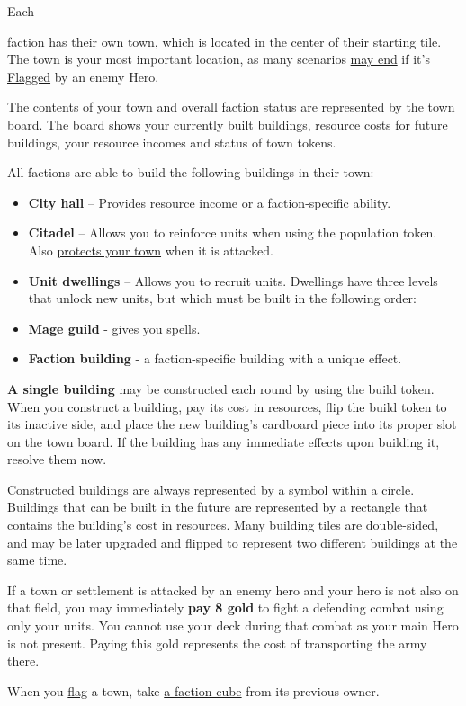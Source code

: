 \hypertarget{Town}{Each} faction has their own town, which is located in the center of their starting tile.
The town is your most important location, as many scenarios \hyperlink{End}{may end} if it's \hyperlink{Categories}{Flagged} by an enemy Hero.\par
The contents of your town and overall faction status are represented by the town board.
The board shows your currently built buildings, resource costs for future buildings, your resource incomes and status of town tokens.\par
All factions are able to build the following buildings in their town:
\begin{itemize}
  \item \textbf{City hall} – Provides resource income or a faction-specific ability.
  \item \textbf{Citadel} – Allows you to reinforce units when using the population token.
Also \hyperlink{Walls}{protects your town} when it is attacked.
  \item \textbf{Unit dwellings} – Allows you to recruit units.
Dwellings have three levels that unlock new units, but which must be built in the following order:
  \item \textbf{Mage guild} - gives you \hyperlink{spells}{spells}.
  \item \textbf{Faction building} - a faction-specific building with a unique effect.
\end{itemize}
\textbf{A single building} may be constructed each round by using the build token.
When you construct a building, pay its cost in resources, flip the build token to its inactive side, and place the new building’s cardboard piece into its proper slot on the town board.
If the building has any immediate effects upon building it, resolve them now.\par
Constructed buildings are always represented by a symbol within a circle.
Buildings that can be built in the future are represented by a rectangle that contains the building's cost in resources.
Many building tiles are double-sided, and may be later upgraded and flipped to represent two different buildings at the same time.\par
If a town or settlement is attacked by an enemy hero and your hero is not also on that field, you may immediately \textbf{pay 8 gold} to fight a defending combat using only your units.
You cannot use your deck during that combat as your main Hero is not present.
Paying this gold represents the cost of transporting the army there.\par
When you \hyperlink{Categories}{flag} a town, take \hyperlink{End}{a faction cube} from its previous owner.
